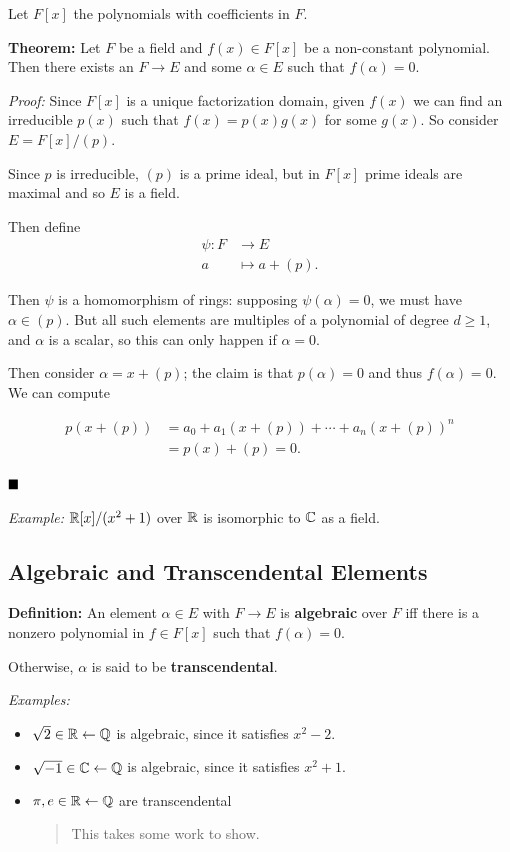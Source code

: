 Let \(F[x]\) the polynomials with coefficients in \(F\).

\textbf{Theorem:} Let \(F\) be a field and \(f(x) \in F[x]\) be a
non-constant polynomial. Then there exists an \(F \to E\) and some
\(\alpha \in E\) such that \(f(\alpha) = 0\).

\emph{Proof:} Since \(F[x]\) is a unique factorization domain, given
\(f(x)\) we can find an irreducible \(p(x)\) such that
\(f(x) = p(x) g(x)\) for some \(g(x)\). So consider \(E = F[x] / (p)\).

Since \(p\) is irreducible, \((p)\) is a prime ideal, but in \(F[x]\)
prime ideals are maximal and so \(E\) is a field.

Then define \begin{align*}
\psi: F &\to E \\
a &\mapsto a + (p)
.\end{align*}

Then \(\psi\) is a homomorphism of rings: supposing
\(\psi(\alpha) = 0\), we must have \(\alpha \in (p)\). But all such
elements are multiples of a polynomial of degree \(d \geq 1\), and
\(\alpha\) is a scalar, so this can only happen if \(\alpha = 0\).

Then consider \(\alpha = x + (p)\); the claim is that \(p(\alpha) = 0\)
and thus \(f(\alpha) = 0\). We can compute

\begin{align*}
p(x + (p)) &= a_0 + a_1(x + (p)) + \cdots + a_n(x + (p))^n \\
&= p(x) + (p) = 0
.\end{align*}

\(\qed\)

\emph{Example:} \({\mathbb{R}}[x] / (x^2 + 1)\) over \({\mathbb{R}}\) is isomorphic to
\({\mathbb{C}}\) as a field.

\hypertarget{algebraic-and-transcendental-elements}{%
\subsection{Algebraic and Transcendental
Elements}\label{algebraic-and-transcendental-elements}}

\textbf{Definition:} An element \(\alpha \in E\) with \(F \to E\) is
\textbf{algebraic} over \(F\) iff there is a nonzero polynomial in
\(f \in F[x]\) such that \(f(\alpha) = 0\).

Otherwise, \(\alpha\) is said to be \textbf{transcendental}.

\emph{Examples:}

\begin{itemize}
\item
  \(\sqrt 2 \in {\mathbb{R}} \leftarrow {\mathbb{Q}}\) is algebraic, since it satisfies
  \(x^2 - 2\).
\item
  \(\sqrt{-1} \in {\mathbb{C}} \leftarrow {\mathbb{Q}}\) is algebraic, since it satisfies
  \(x^2 + 1\).
\item
  \(\pi, e \in {\mathbb{R}} \leftarrow {\mathbb{Q}}\) are transcendental

  \begin{quote}
  This takes some work to show.
  \end{quote}
\end{itemize}


